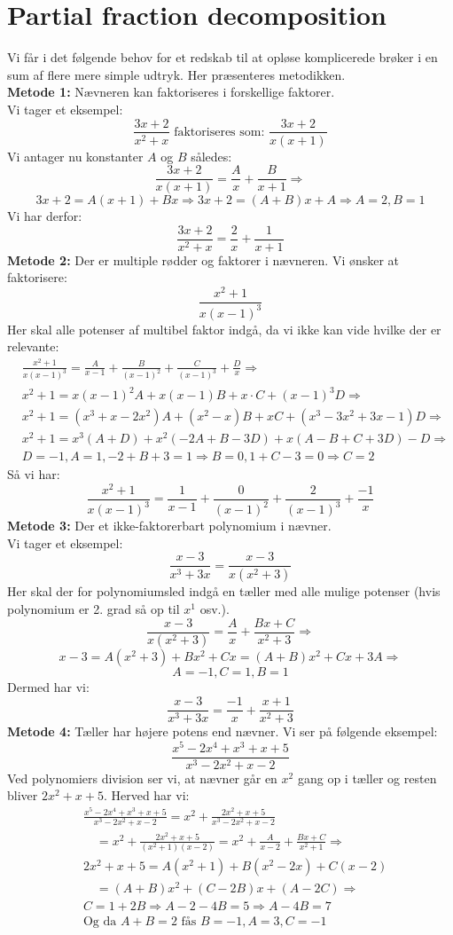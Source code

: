 \section{Partial fraction decomposition}
Vi får i det følgende behov for et redskab til at opløse komplicerede brøker i en sum af flere mere simple udtryk. Her præsenteres metodikken.\\
{\bf Metode 1:} Nævneren kan faktoriseres i forskellige faktorer. \\Vi tager et eksempel:
\[\frac{3x+2}{x^{2}+x} \text{ faktoriseres som: } \frac{3x+2}{x(x+1)}\]
Vi antager nu konstanter \(A\) og \(B\) således:
\[\frac{3x+2}{x(x+1)}=\frac{A}{x}+\frac{B}{x+1} \Rightarrow\]
\[3x+2=A(x+1)+Bx \Rightarrow 3x+2=(A+B)x+A \Rightarrow A=2, B=1\]
Vi har derfor:
\[\frac{3x+2}{x^{2}+x}=\frac{2}{x}+\frac{1}{x+1}\]
{\bf Metode 2:} Der er multiple rødder og faktorer i nævneren.
Vi ønsker at faktorisere:
\[\frac{x^{2}+1}{x(x-1)^{3}}\]
Her skal alle potenser af multibel faktor indgå, da vi ikke kan vide hvilke der er relevante:
\begin{align*}
&\frac{x^{2}+1}{x(x-1)^{3}}=\frac{A}{x-1}+\frac{B}{(x-1)^{2}}+\frac{C}{(x-1)^{3}}+\frac{D}{x} \Rightarrow \\
&x^{2}+1=x(x-1)^{2}A+x(x-1)B+x \cdot C+(x-1)^{3}D \Rightarrow\\
&x^{2}+1=(x^{3}+x-2x^{2})A+(x^{2}-x)B+xC+(x^{3}-3x^{2}+3x-1)D \Rightarrow\\
&x^{2}+1=x^{3}(A+D)+x^{2}(-2A+B-3D)+x(A-B+C+3D)-D \Rightarrow \\
&D=-1, A=1, -2+B+3=1 \Rightarrow B=0, 1+C-3=0 \Rightarrow C=2
\end{align*}
Så vi har:
\[\frac{x^{2}+1}{x(x-1)^{3}}=\frac{1}{x-1}+\frac{0}{(x-1)^{2}}+\frac{2}{(x-1)^{3}}+\frac{-1}{x}\]
{\bf Metode 3:} Der et ikke-faktorerbart polynomium i nævner.\\
Vi tager et eksempel:
\[\frac{x-3}{x^{3}+3x}=\frac{x-3}{x(x^{2}+3)}\]
Her skal der for polynomiumsled indgå en tæller med alle mulige potenser (hvis polynomium er 2. grad så op til \(x^{1}\) osv.).
\[\frac{x-3}{x(x^{2}+3)}=\frac{A}{x}+\frac{Bx+C}{x^{2}+3} \Rightarrow\]
\[x-3=A(x^{2}+3)+Bx^{2}+Cx=(A+B)x^{2}+Cx+3A \Rightarrow\]
\[ A=-1, C=1, B=1 \]
Dermed har vi:
\[\frac{x-3}{x^{3}+3x}=\frac{-1}{x}+\frac{x+1}{x^{2}+3}\]
{\bf Metode 4:} Tæller har højere potens end nævner.
Vi ser på følgende eksempel:
\[\frac{x^{5}-2x^{4}+x^{3}+x+5}{x^{3}-2x^{2}+x-2}\]
Ved polynomiers division ser vi, at nævner går en \(x^{2}\) gang op i tæller og resten bliver \(2x^{2}+x+5\). Herved har vi:
\begin{align*}
&\frac{x^{5}-2x^{4}+x^{3}+x+5}{x^{3}-2x^{2}+x-2}=x^{2}+\frac{2x^{2}+x+5}{x^{3}-2x^{2}+x-2}\\
&\quad=x^{2}+\frac{2x^{2}+x+5}{(x^{2}+1)(x-2)}=x^{2}+\frac{A}{x-2}+\frac{Bx+C}{x^{2}+1} \Rightarrow\\
&2x^{2}+x+5=A(x^{2}+1)+B(x^{2}-2x)+C(x-2)\\
&\quad=(A+B)x^{2}+(C-2B)x+(A-2C) \Rightarrow\\
&C=1+2B \Rightarrow A-2-4B=5 \Rightarrow A-4B=7\\
&\text{Og da } A+B=2 \text{ fås } B=-1, A=3, C=-1
\end{align*}
